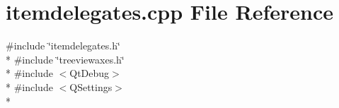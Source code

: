 \section{itemdelegates.\+cpp File Reference}
\label{itemdelegates_8cpp}
{\ttfamily \#include \char`\"{}itemdelegates.\+h\char`\"{}}\\*
{\ttfamily \#include \char`\"{}treeviewaxes.\+h\char`\"{}}\\*
{\ttfamily \#include $<$Qt\+Debug$>$}\\*
{\ttfamily \#include $<$Q\+Settings$>$}\\*
